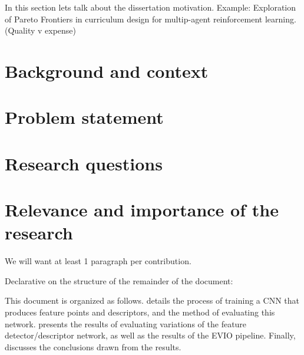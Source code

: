 
In this section lets talk about the dissertation motivation.
Example:
Exploration of Pareto Frontiers in curriculum design for multip-agent reinforcement learning. (Quality v expense)


\section{Background and context}%
\label{sec:background}

\section{Problem statement}%
\label{sec:problem_statement}

\section{Research questions}%
\label{sec:research_question}

\section{Relevance and importance of the research}%
\label{sec:relevance_and_importance}

We will want at least 1 paragraph per contribution.

Declarative on the structure of the remainder of the document:

This document is organized as follows. 
 details the process of training a \gls{CNN} that produces feature points and descriptors, and the method of evaluating this network. 
 presents the results of evaluating variations of the feature detector/descriptor network, as well as the results of the \gls{EVIO} pipeline. 
Finally,  discusses the conclusions drawn from the results.



